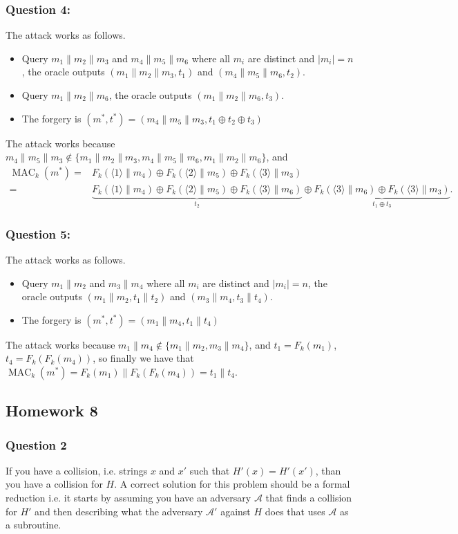\documentclass{article}
\numberwithin{defn}{section}
\numberwithin{equation}{section}
\newcommand{\MAC}{\operatorname{MAC}}
\begin{document}
\subsubsection*{Question 4:}
The attack works as follows. 
\begin{itemize}
	\item Query $m_1\|m_2\|m_3$ and $m_4\|m_5\|m_6$ where all $m_i$ are distinct and $|m_i|=n$, the oracle outputs $( m_1\|m_2\|m_3,t_1)$ and $( m_4\|m_5\|m_6,t_2)$.
	\item Query $m_1\|m_2\|m_6$, the oracle outputs $(m_1\|m_2\|m_6,t_3)$.
	\item The forgery is $(m^*,t^*)=( m_4\|m_5\|m_3,t_1\oplus t_2\oplus t_3 )$
\end{itemize}	
The attack works because $m_4\|m_5\|m_3\not\in \{m_1\|m_2\|m_3, m_4\|m_5\|m_6,m_1\|m_2\|m_6 \}$, and
\begin{align*}
\MAC_k(m^*)=&F_k(\langle 1\rangle \|m_4)\oplus F_k(\langle 2\rangle \|m_5)\oplus F_k(\langle 3\rangle \|m_3)\\
=& \underset{t_2}{\underbrace{F_k(\langle 1\rangle \|m_4)\oplus F_k(\langle 2\rangle \|m_5)\oplus F_k(\langle 3\rangle \|m_6)}} \oplus \underset{t_1\oplus t_3}{\underbrace{F_k(\langle 3\rangle \|m_6)\oplus F_k(\langle 3\rangle \|m_3)}}.
\end{align*}

\subsubsection*{Question 5:}
The attack works as follows. 
\begin{itemize}
	\item Query $m_1\|m_2$ and $m_3\|m_4$ where all $m_i$ are distinct and $|m_i|=n$, the oracle outputs $( m_1\|m_2,t_1\| t_2)$ and $( m_3\|m_4 ,t_3\|t_4)$.
	\item The forgery is $(m^*,t^*)=( m_1\|m_4,t_1\| t_4 )$
\end{itemize}	
The attack works because $m_1\|m_4 \not\in \{m_1\|m_2, m_3\|m_4 \}$, and $t_1=F_k(m_1)$, $t_4=F_k(F_k(m_4))$, so finally we have that $\MAC_k(m^*)=F_k(m_1)\|  F_k(F_k(m_4))=t_1\|t_4$. 
	

\subsection*{Homework 8}

	\subsubsection*{Question 2}
	If you have a collision, i.e. strings $x$ and $x'$ such that $H'(x)=H'(x')$, than you have a collision for $H$. A correct solution for this problem should be a formal reduction i.e. it starts by assuming you have an adversary $\mathcal{A}$ that finds a collision for $H'$ and then describing what the adversary $\mathcal{A}'$ against $H$ does that uses $\mathcal{A}$ as a subroutine.
	
\end{document}
